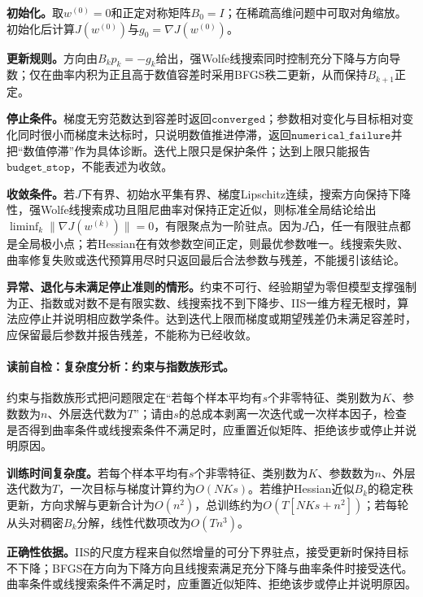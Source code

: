 \label{struct:V3-C01-CH22}
\textbf{初始化。}取$w^{(0)}=0$和正定对称矩阵$B_0=I$；在稀疏高维问题中可取对角缩放。初始化后计算$J(w^{(0)})$与$g_0=\nabla J(w^{(0)})$。

\label{struct:V3-C01-CH23}
\textbf{更新规则。}方向由$B_kp_k=-g_k$给出，强Wolfe线搜索同时控制充分下降与方向导数；仅在曲率内积为正且高于数值容差时采用BFGS秩二更新，从而保持$B_{k+1}$正定。

\label{struct:V3-C01-CH24}
\textbf{停止条件。}梯度无穷范数达到容差时返回$\mathtt{converged}$；参数相对变化与目标相对变化同时很小而梯度未达标时，只说明数值推进停滞，返回$\mathtt{numerical\_failure}$并把“数值停滞”作为具体诊断。迭代上限只是保护条件；达到上限只能报告$\mathtt{budget\_stop}$，不能表述为收敛。

\label{struct:V3-C01-CH25}
\textbf{收敛条件。}若$J$下有界、初始水平集有界、梯度Lipschitz连续，搜索方向保持下降性，强Wolfe线搜索成功且阻尼曲率对保持正定近似，则标准全局结论给出$\liminf_k\|\nabla J(w^{(k)})\|=0$，有限聚点为一阶驻点。因为$J$凸，任一有限驻点都是全局极小点；若Hessian在有效参数空间正定，则最优参数唯一。线搜索失败、曲率修复失败或迭代预算用尽时只返回最后合法参数与残差，不能援引该结论。

\textbf{异常、退化与未满足停止准则的情形。}约束不可行、经验期望为零但模型支撑强制为正、指数或对数不是有限实数、线搜索找不到下降步、IIS一维方程无根时，算法应停止并说明相应数学条件。达到迭代上限而梯度或期望残差仍未满足容差时，应保留最后参数并报告残差，不能称为已经收敛。

\label{struct:V3-C01-CH26}
\label{struct:V3-C01-CH27}
\paragraph{读前自检：复杂度分析：约束与指数族形式。}约束与指数族形式把问题限定在“若每个样本平均有$s$个非零特征、类别数为$K$、参数数为$n$、外层迭代数为$T$”；请由$s$的总成本剥离一次迭代或一次样本因子，检查是否得到曲率条件或线搜索条件不满足时，应重置近似矩阵、拒绝该步或停止并说明原因。\par

\begin{complexitybox}
\textbf{训练时间复杂度。}若每个样本平均有$s$个非零特征、类别数为$K$、参数数为$n$、外层迭代数为$T$，一次目标与梯度计算约为$O(NKs)$。若维护Hessian近似$B_k$的稳定秩更新，方向求解与更新合计为$O(n^2)$，总训练约为$O(T[NKs+n^2])$；若每轮从头对稠密$B_k$分解，线性代数项改为$O(Tn^3)$。

\textbf{正确性依据。}IIS的尺度方程来自似然增量的可分下界驻点，接受更新时保持目标不下降；BFGS在方向为下降方向且线搜索满足充分下降与曲率条件时接受迭代。曲率条件或线搜索条件不满足时，应重置近似矩阵、拒绝该步或停止并说明原因。
\end{complexitybox}

